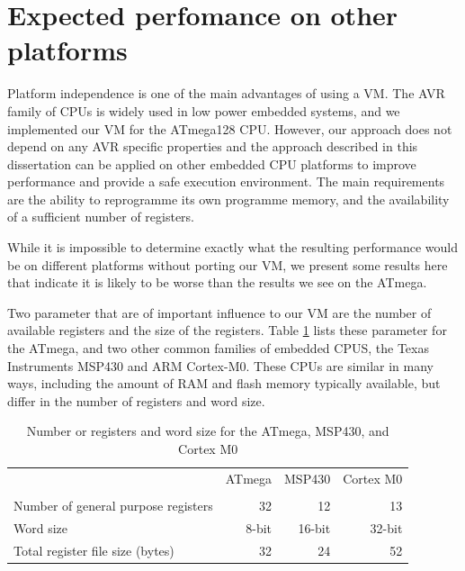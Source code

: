 \section{Expected perfomance on other platforms}
\label{sec-evaluation-other-platforms}
Platform independence is one of the main advantages of using a VM. The AVR family of CPUs is widely used in low power embedded systems, and we implemented our VM for the ATmega128 CPU. However, our approach does not depend on any AVR specific properties and the approach described in this dissertation can be applied on other embedded CPU platforms to improve performance and provide a safe execution environment. The main requirements are the ability to reprogramme its own programme memory, and the availability of a sufficient number of registers.

While it is impossible to determine exactly what the resulting performance would be on different platforms without porting our VM, we present some results here that indicate it is likely to be worse than the results we see on the ATmega.

Two parameter that are of important influence to our VM are the number of available registers and the size of the registers. Table \ref{tbl-ATmega-msp430-m0-registers} lists these parameter for the ATmega, and two other common families of embedded CPUS, the Texas Instruments MSP430 and ARM Cortex-M0. These CPUs are similar in many ways, including the amount of RAM and flash memory typically available, but differ in the number of registers and word size.

\begin{table}
\caption{Number or registers and word size for the ATmega, MSP430, and Cortex M0}
\label{tbl-ATmega-msp430-m0-registers}
    \begin{tabular}{lrrr}
    \toprule
                                           & ATmega       & MSP430     & Cortex M0 \\
                                           & \cite{Atmel:ATmega128Datasheet, Atmel:AVRInstructionSetManual}
                                           & \cite{TexasInstrumentsIncorporated:MSP430F1611Datasheet, TexasInstrumentsIncorporated:MSP430x1xxUsersGuide}
                                           & \cite{ARM:2009vz} \\
    \midrule
    \midrule
    Number of general purpose registers    & 32           & 12         & 13        \\
    Word size                              & 8-bit        & 16-bit     & 32-bit    \\
    Total register file size (bytes)       & 32           & 24         & 52        \\
    \bottomrule
    \end{tabular}
\end{table}

